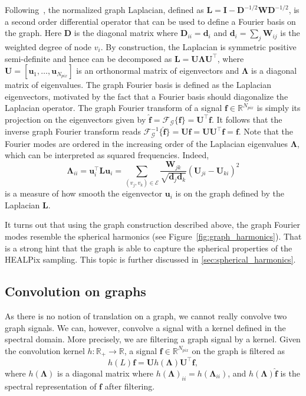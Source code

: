 \documentclass[final,twocolumn,3p,times,authoryear]{elsarticle}
\newcommand{\figref}[1]{Figure~\ref{fig:#1}}
\renewcommand{\b}[1]{{\bm{#1}}}   %
\newcommand{\1}{\b{1}}              %
\newcommand{\0}{\b{0}}              %
\newcommand{\G}{\mathcal{G}}
\newcommand{\E}{\mathcal{E}}
\renewcommand{\L}{\b{L}}
\newcommand{\W}{\b{W}}
\newcommand{\I}{\b{I}}
\newcommand{\D}{\b{D}}
\newcommand{\U}{\b{U}}
\newcommand{\f}{\b{f}}
\newcommand{\trans}{^\intercal}
\newcommand{\R}{\mathbb{R}}
\newcommand{\bLambda}{\b{\Lambda}}
\begin{document}
Following~\cite{shuman2013emerging}, the normalized graph Laplacian,
defined as $\L = \I - \D^{-1/2} \W \D^{-1/2}$, is a second order differential operator
that can be used to define a Fourier basis on the graph. Here $\D$ is the diagonal
matrix where $\D_{ii} = \b{d}_i$ and $\b{d}_i = \sum_j \W_{ij}$ is the weighted degree of node $v_i$. By construction, the Laplacian is symmetric positive
semi-definite and hence can be decomposed as $\L = \U \bLambda \U\trans$, where $\U = [\b u_1, \ldots, \b u_{N_{pix}}]$ is an
orthonormal matrix of eigenvectors and $\bLambda$ is a diagonal matrix of
eigenvalues. The graph Fourier basis is defined as the Laplacian eigenvectors, motivated by the fact that a Fourier basis should diagonalize the Laplacian operator.
The graph Fourier transform of a signal $\f \in \R^{N_{pix}}$ is simply its projection on the eigenvectors given by
$\hat{\f} = \mathcal{F}_\G \{\f\} = \U\trans \f$. It follows that the inverse graph Fourier transform reads $\mathcal{F}^{-1}_\G \{\hat{\f}\} = \U\hat{\f} = \U \U\trans \f = \f$.
Note that the Fourier modes are ordered in the increasing order of the Laplacian eigenvalues $\bLambda$, which can be interpreted as squared frequencies.
Indeed,
\begin{equation*}
	\bLambda_{ii} = \b u_i\trans \L \b u_i = \sum_{(v_j, v_k) \in \E} \frac{\W_{jk}}{\sqrt{\b d_j \b d_k}} (\U_{ji} - \U_{ki})^2
\end{equation*}
is a measure of how smooth the eigenvector $\b u_i$ is on the graph defined by the Laplacian $\L$.

It turns out that using the graph construction described above, the graph Fourier modes resemble the spherical harmonics (see \figref{graph_harmonics}). That is a strong hint that the graph is able to capture the spherical properties of the HEALPix sampling. This topic is further discussed in \ref{sec:spherical_harmonics}.

\subsection{Convolution on graphs}

As there is no notion of translation on a graph, we cannot really convolve two graph signals. We can, however, convolve a signal with a kernel defined in the spectral domain. More precisely, we are filtering a graph signal by a kernel. Given the convolution kernel
$h: \R_+ \rightarrow \R$, a signal $\f \in \R^{N_{pix}}$ on the graph is filtered as
\begin{equation} \label{eqn:graph_convolution}
	h(L) \f = \U h(\bLambda) \U\trans \f,
\end{equation}
where $h(\bLambda)$ is a diagonal matrix where $h(\bLambda)_{ii} = h(\bLambda_{ii})$, and $h(\bLambda) \hat{\f}$ is the spectral representation of $\f$ after filtering.
\end{document}

